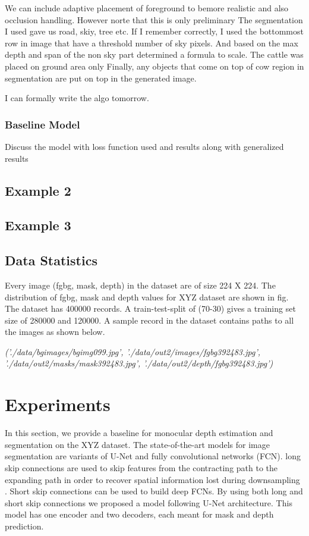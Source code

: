 \documentclass[review]{cvpr}
\begin{document}
We can include adaptive placement of foreground to bemore realistic and also occlusion handling. However norte that this is only preliminary
The segmentation I used gave us road, skiy, tree etc. If I remember correctly, I used the bottommost row in image that have a threshold number of
sky pixels. And based on the max depth and span of the non sky part determined a formula to scale. The cattle was placed on ground area only
Finally, any objects that come on top of cow region in segmentation are put on top in the generated image.

I can formally write the algo tomorrow.

\subsubsection{Baseline Model}
Discuss the model with loss function used and results along with generalized results

\subsection{Example 2} %

\subsection{Example 3} %




\subsection{Data Statistics}
Every image (fgbg, mask, depth) in the dataset are of size 224 X 224. 
The distribution of fgbg, mask and depth values for XYZ dataset are shown in fig. 
The dataset has 400000 records. A train-test-split of (70-30) gives a training set size of 280000 and 120000. 
A sample record in the dataset contains paths to all the images as shown below.

\textit{('./data/bgimages/bgimg099.jpg', 
'./data/out2/images/fgbg392483.jpg', 
'./data/out2/masks/mask392483.jpg', 
'./data/out2/depth/fgbg392483.jpg')}

\section{Experiments}
In this section, we provide a baseline for monocular depth estimation and segmentation on the XYZ dataset. 
The state-of-the-art models for image segmentation are variants of U-Net and fully convolutional networks (FCN)\cite{drozdzal2016importance}. 
long skip connections are used to skip features from the contracting path to the expanding path in order to recover 
spatial information lost during downsampling \cite{zhou2019unet++}. Short skip connections can be used to build deep FCNs. 
By using both long and short skip connections we proposed a model following U-Net architecture. 
This model has one encoder and two decoders, each meant for mask and depth prediction.
\end{document}
